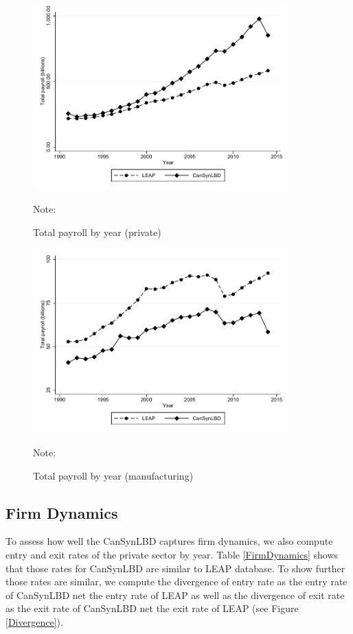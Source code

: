 \begin{figure} [H]
\centering
\caption{Total payroll by year (private)} \label{TotalPayrollPrivate}
\includegraphics[height=2.8in, width=.7\linewidth]{graphs/Total_payroll_by_year_private_bw.pdf} 
\begin{minipage}{0.85\textwidth}
{\footnotesize Note: \TableNote \par}
\end{minipage}
\end{figure}
\begin{figure} [H]
\centering
\caption{Total payroll by year (manufacturing)} \label{TotalPayrollManufacturing}
\includegraphics[height=2.8in, width=.7\linewidth]{graphs/Total_payroll_by_year_manufacturing_bw.pdf} 
\begin{minipage}{0.85\textwidth}
{\footnotesize Note: \TableNote \par}
\end{minipage}
\end{figure}

\subsection{Firm Dynamics}
To assess how well the CanSynLBD captures firm dynamics, we also compute entry and exit rates of the private sector by year. Table \ref{FirmDynamics} shows that those rates for CanSynLBD are similar to LEAP database. To show further those rates are similar, we compute the divergence of entry rate as the entry rate of CanSynLBD net the entry rate of LEAP as well as the divergence of exit rate as the exit rate of CanSynLBD net the exit rate of LEAP (see Figure \ref{Divergence}).

